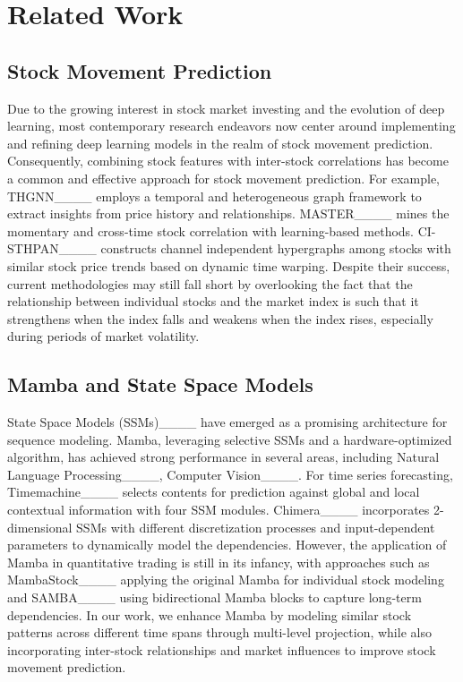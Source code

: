 \section{Related Work}
\subsection{Stock Movement Prediction}
Due to the growing interest in stock market investing and the evolution of deep learning, most contemporary research endeavors now center around implementing and refining deep learning models in the realm of stock movement prediction. 
Consequently, combining stock features with inter-stock correlations has become a common and effective approach for stock movement prediction.
For example, THGNN____ employs a temporal and heterogeneous graph framework to extract insights from price history and relationships. MASTER____ mines the momentary and cross-time stock correlation with learning-based methods. CI-STHPAN____ constructs channel independent hypergraphs among stocks with similar stock price trends based on dynamic time warping.
Despite their success, current methodologies may still fall short by overlooking the fact that the relationship between individual stocks and the market index is such that it strengthens when the index falls and weakens when the index rises, especially during periods of market volatility.


\subsection{Mamba and State Space Models}
State Space Models (SSMs)____ have emerged as a promising architecture for sequence modeling. Mamba, leveraging selective SSMs and a hardware-optimized algorithm, has achieved strong performance in several areas, including Natural Language Processing____, Computer Vision____. 
For time series forecasting, Timemachine____ selects contents
for prediction against global and local contextual information with four SSM modules. Chimera____ incorporates 2-dimensional SSMs with different discretization processes and input-dependent parameters to dynamically model the dependencies.
However, the application of Mamba in quantitative trading is still in its infancy, with approaches such as MambaStock____ applying the original Mamba for individual stock modeling and SAMBA____ using bidirectional Mamba blocks to capture long-term dependencies.
In our work, we enhance Mamba by modeling similar stock patterns across different time spans through multi-level projection, while also incorporating inter-stock relationships and market influences to improve stock movement prediction.